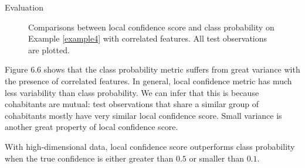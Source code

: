 \documentclass[12pt]{pom_thesis}
\begin{document}
\begin{chapter}{Evaluation}
\begin{figure}[h]
\centering
\label{fig4}

\caption{Comparisons between local confidence score and class probability on Example \ref{example4} with correlated features. All test observations are plotted.}
\end{figure}

Figure 6.6 shows that the class probability metric suffers from great variance with the presence of correlated features. In general, local confidence metric has much less variability than class probability. We can infer that this is because cohabitants are mutual: test observations that share a similar group of cohabitants mostly have very similar local confidence score. Small variance is another great property of local confidence score.

With high-dimensional data, local confidence score outperforms class probability when the true confidence is either greater than $0.5$ or smaller than $0.1$.




\end{chapter}
\end{document}
